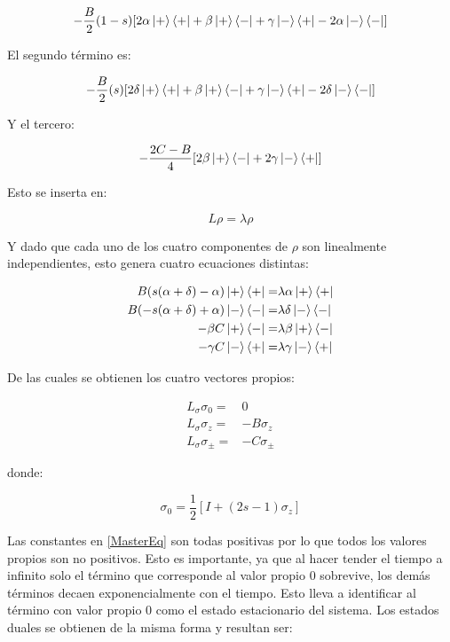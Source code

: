 \documentclass[a4paper,10pt]{report}
\begin{document}
\begin{equation}
-\frac{B}{2}(1-s)[2\alpha\Ket{+}\Bra{+}+\beta\Ket{+}\Bra{-}+\gamma\Ket{-}\Bra{+}-2\alpha\Ket{-}\Bra{-}]
\end{equation}

El segundo término es:

\begin{equation}
-\frac{B}{2}(s)[2\delta\Ket{+}\Bra{+}+\beta\Ket{+}\Bra{-}+\gamma\Ket{-}\Bra{+}-2\delta\Ket{-}\Bra{-}]
\end{equation}

Y el tercero:

\begin{equation}
-\frac{2C-B}{4}[2\beta\Ket{+}\Bra{-}+2\gamma\Ket{-}\Bra{+}]
\end{equation}

Esto se inserta en:

\begin{equation}
L\rho = \lambda\rho
\end{equation}

Y dado que cada uno de los cuatro componentes de $\rho$ son linealmente independientes, esto genera cuatro ecuaciones distintas:

\begin{align}
B(s(\alpha+\delta)-\alpha)\Ket{+}\Bra{+} =& \lambda\alpha\Ket{+}\Bra{+}\\
B(-s(\alpha+\delta)+\alpha)\Ket{-}\Bra{-} =& \lambda\delta\Ket{-}\Bra{-}\\
-\beta C \Ket{+}\Bra{-} =& \lambda \beta \Ket{+}\Bra{-} \\
-\gamma C \Ket{-}\Bra{+} =& \lambda \gamma \Ket{-}\Bra{+}
\end{align}

De las cuales se obtienen los cuatro vectores propios:

\begin{align}
L_\sigma \sigma_0 =& 0 \\
L_\sigma \sigma_z =& -B \sigma_z \\
L_\sigma \sigma_\pm =& -C \sigma_\pm
\end{align}

donde:

\begin{equation}
\sigma_0 = \frac{1}{2}[I + (2s-1)\sigma_z]
\end{equation}

Las constantes en \eqref{MasterEq} son todas positivas por lo que todos los valores propios son no positivos. Esto es importante, ya que al hacer tender el tiempo a infinito solo el término que corresponde al valor propio 0 sobrevive, los demás términos decaen exponencialmente con el tiempo. Esto lleva a identificar al término con valor propio 0 como el estado estacionario del sistema. Los estados duales se obtienen de la misma forma y resultan ser\cite{EnglertDB}:
\end{document}

